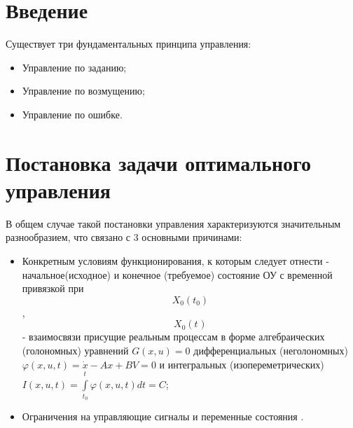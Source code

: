 \documentclass[preprint,russian,a5paper,10pt,twoside]{ncc}
\begin{document}

\setcounter{page}{2}
\thispagestyle{empty}
\mbox{}
\newpage
\tableofcontents
\newpage

\section{Введение\label{intro}}

Существует три фундаментальных принципа управления:
\begin{itemize}
\item Управление по заданию;
\item Управление по возмущению;
\item Управление по ошибке.
\end{itemize}

\newpage

\section{Постановка задачи оптимального управления\label{task}}
В общем случае такой постановки управления характеризуются значительным разнообразием, что связано с 3 основными причинами:

\begin{itemize}
\item Конкретным условиям функционирования, к которым следует отнести - начальное(исходное) и конечное (требуемое) состояние ОУ с временной привязкой при \[{{X}_{0}}\left( {{t}_{0}} \right)\], \[{{X}_{0}}\left( {{t}_{}} \right)\] - взаимосвязи присущие реальным процессам в форме алгебраических (голономных) уравнений $G\left( x,u \right)=0$ дифференциальных (неголономных) $\varphi \left( x,u,t \right)=\dot{x}-Ax+BV=0$ и интегральных (изопереметрических) $I\left( x,u,t \right)=\int\limits_{{{t}_{0}}}^{{{t}_{}}}{\varphi \left( x,u,t \right)dt=C}$;
\item Ограничения на управляющие сигналы и переменные состояния .
\end{itemize}
\par
\end{document}
